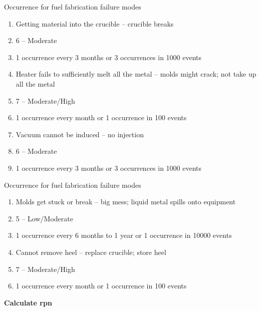 \documentclass[aspectratio=1610,pdftex,dvipsnames,compress,xcolor={dvipsnames}]{beamer}
\newcommand{\acf}{\acrfull} %
\begin{document}
\begin{frame}{Occurrence for fuel fabrication failure modes}
    \begin{enumerate}[series=outerlist,topsep=0pt,itemsep=3pt,leftmargin=*,label=(\arabic*)]
        \item[]Getting material into the crucible -- crucible breaks
        \item[]6 -- Moderate
        \item[]1 occurrence every 3 months or 3 occurrences in 1000 events
            \vspace{0.10in}
        \item[]Heater fails to sufficiently melt all the metal -- molds might crack; not take up all the metal
        \item[]7 -- Moderate/High
        \item[]1 occurrence every month or 1 occurrence in 100 events
            \vspace{0.10in}
        \item[]Vacuum cannot be induced -- no injection
        \item[]6 -- Moderate
        \item[]1 occurrence every 3 months or 3 occurrences in 1000 events
    \end{enumerate}
\end{frame}


\begin{frame}{Occurrence for fuel fabrication failure modes}
    \begin{enumerate}[series=outerlist,topsep=0pt,itemsep=3pt,leftmargin=*,label=(\arabic*)]
        \item[]Molds get stuck or break -- big mess; liquid metal spills onto equipment
        \item[]5 -- Low/Moderate
        \item[]1 occurrence every 6 months to 1 year or 1 occurrence in 10000 events
            \vspace{0.10in}
        \item[]Cannot remove heel -- replace crucible; store heel
        \item[]7 -- Moderate/High
        \item[]1 occurrence every month or 1 occurrence in 100 events
    \end{enumerate}
\end{frame}


\begin{frame}[plain]{}
    \centering\LARGE\textbf{Calculate \acf{rpn}}
\end{frame}
\end{document}
